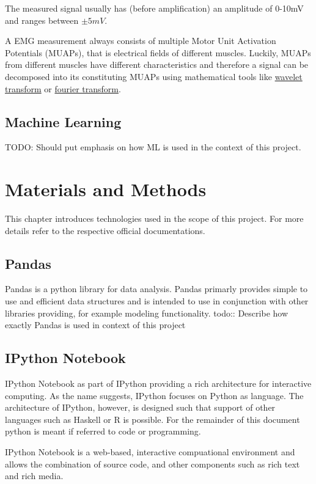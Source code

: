 \documentclass[letterpaper,10pt,english]{sphinxmanual}
\begin{document}
The measured signal usually has (before amplification) an amplitude of 0-10mV
and ranges between \(\pm5mV\).

A EMG measurement always consists of multiple Motor Unit Activation Potentials
(MUAPs), that is electrical fields of different muscles. Luckily, MUAPs from
different muscles have different characteristics and therefore a signal can be
decomposed into its constituting MUAPs using mathematical tools like \href{http://en.wikipedia.org/wiki/Wavelet\_transform}{wavelet
transform} or \href{http://en.wikipedia.org/wiki/Fourier\_transform}{fourier
transform}.


\section{Machine Learning}
\label{intro:machine-learning}
TODO: Should put emphasis on how ML is used in the context of this project.


\chapter{Materials and Methods}
\label{materials::doc}\label{materials:materials-and-methods}
This chapter introduces technologies used in the scope of this project. For more
details refer to the respective official documentations.


\section{Pandas}
\label{materials:pandas}
Pandas is a python library for data analysis. Pandas primarly provides simple to
use and efficient data structures and is intended to use in conjunction with
other libraries providing, for example modeling functionality.
todo:: Describe how exactly Pandas is used in context of this project


\section{IPython Notebook}
\label{materials:ipython-notebook}
IPython Notebook as part of IPython providing a rich architecture for
interactive computing. As the name suggests, IPython focuses on Python as
language. The architecture of IPython, however, is designed such that support
of other languages such as Haskell or R is possible. For the remainder of this
document python is meant if referred to code or programming.

IPython Notebook is a web-based, interactive compuational environment and
allows the combination of source code, and other components such as rich text
and rich media.
\end{document}
